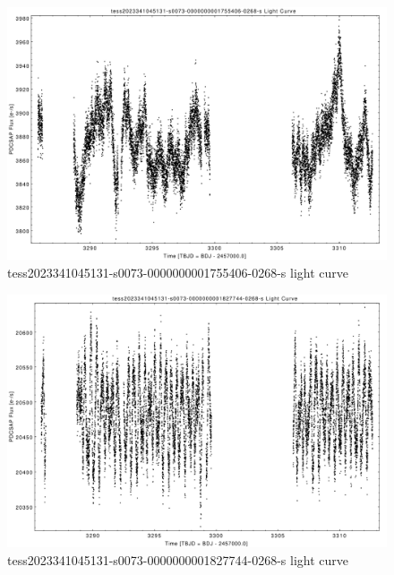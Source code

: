 \documentclass[a4paper,12pt]{article}
\begin{document}
\begin{figure}[htbp]
    \centering
    \includegraphics[width = 1\textwidth]{
      lightcurves/tess2023341045131-s0073-0000000001755406-0268-s.pdf}
    \caption{tess2023341045131-s0073-0000000001755406-0268-s light curve}
\end{figure}
\begin{figure}[htbp]
    \centering
    \includegraphics[width = 1\textwidth]{
      lightcurves/tess2023341045131-s0073-0000000001827744-0268-s.pdf}
    \caption{tess2023341045131-s0073-0000000001827744-0268-s light curve}
\end{figure}
\end{document}

